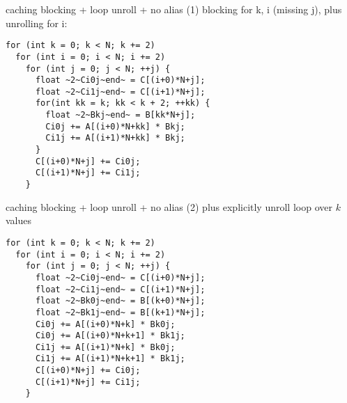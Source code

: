 
\begin{frame}[fragile,label=plusRegBlocking]{caching blocking + loop unroll + no alias (1)}
blocking for k, i (missing j), plus unrolling for i:
\begin{lstlisting}
for (int k = 0; k < N; k += 2)
  for (int i = 0; i < N; i += 2)
    for (int j = 0; j < N; ++j) {
      float ~2~Ci0j~end~ = C[(i+0)*N+j];
      float ~2~Ci1j~end~ = C[(i+1)*N+j];
      for(int kk = k; kk < k + 2; ++kk) {
        float ~2~Bkj~end~ = B[kk*N+j];
        Ci0j += A[(i+0)*N+kk] * Bkj;
        Ci1j += A[(i+1)*N+kk] * Bkj;
      }
      C[(i+0)*N+j] += Ci0j;
      C[(i+1)*N+j] += Ci1j;
    }
\end{lstlisting}
\end{frame}

\begin{frame}[fragile,label=plusRegBlocking2]{caching blocking + loop unroll + no alias (2)}
plus explicitly unroll loop over $k$ values
\begin{lstlisting}
for (int k = 0; k < N; k += 2)
  for (int i = 0; i < N; i += 2)
    for (int j = 0; j < N; ++j) {
      float ~2~Ci0j~end~ = C[(i+0)*N+j];
      float ~2~Ci1j~end~ = C[(i+1)*N+j];
      float ~2~Bk0j~end~ = B[(k+0)*N+j];
      float ~2~Bk1j~end~ = B[(k+1)*N+j];
      Ci0j += A[(i+0)*N+k] * Bk0j;
      Ci0j += A[(i+0)*N+k+1] * Bk1j;
      Ci1j += A[(i+1)*N+k] * Bk0j;
      Ci1j += A[(i+1)*N+k+1] * Bk1j;
      C[(i+0)*N+j] += Ci0j;
      C[(i+1)*N+j] += Ci1j;
    }
\end{lstlisting}
\end{frame}

